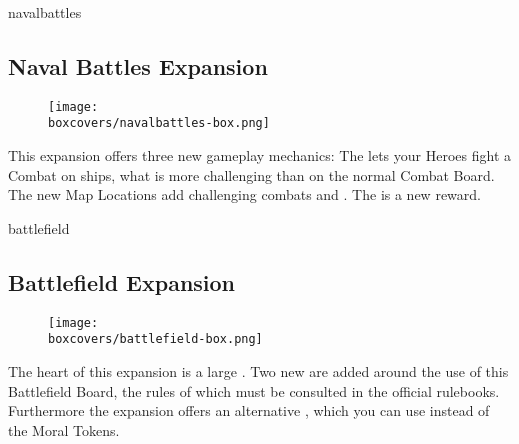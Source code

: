 \begin{multicols*}{2}
\begin{expansion}[title=]{navalbattles}
    \subsection*{\color{navalbattles}Naval Battles Expansion}
    \setlength\intextsep{0pt}
    \setlength\columnsep{0.8em}
    \begin{wrapfigure}{l}{0.35\textwidth}
        \texttt{[image: \\boxcovers/navalbattles-box.png]}
    \end{wrapfigure}
    This expansion offers three new gameplay mechanics:
    The  lets your Heroes fight a Combat on ships, what is more challenging than on the normal Combat Board.
    The new  Map Locations add challenging combats and .
    The  is a new reward.
\end{expansion}

\columnbreak
\begin{expansion}[title=]{battlefield}
    \subsection*{\color{battlefield}Battlefield Expansion}
    \setlength\intextsep{0pt}
    \setlength\columnsep{0.8em}
    \begin{wrapfigure}{l}{0.35\textwidth}
        \texttt{[image: \\boxcovers/battlefield-box.png]}
    \end{wrapfigure}
    The heart of this expansion is a large . Two new  are added around the use of this Battlefield Board, the rules of which must be consulted in the official rulebooks. Furthermore the expansion offers an alternative , which you can use instead of the Moral Tokens.
\end{expansion}
\end{multicols*}

